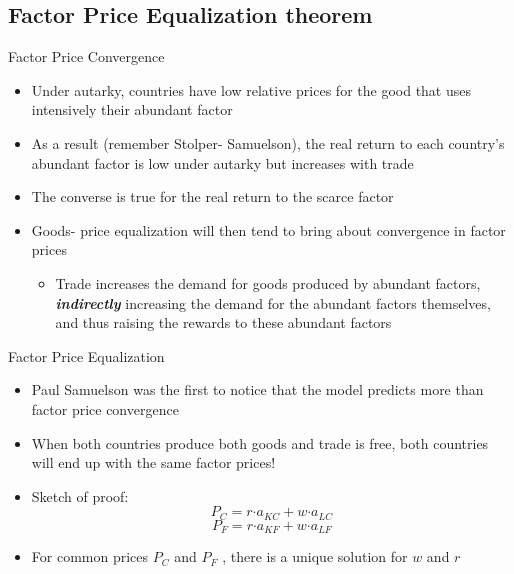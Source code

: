 \documentclass[10pt,hyperref={CJKbookmarks=true},xcolor=dvipsnames,aspectratio=169]{beamer}
\begin{document}
\subsection{Factor Price Equalization theorem}
\begin{frame}{Factor Price Convergence}

\begin{itemize}
\item Under autarky, countries have low relative prices for the good that
uses intensively their abundant factor 
\item As a result (remember Stolper- Samuelson), the real return to each
country’s abundant factor is low under autarky but increases with
trade 
\item The converse is true for the real return to the scarce factor 
\item Goods- price equalization will then tend to bring about convergence
in factor prices 

\begin{itemize}
\item Trade increases the demand for goods produced by abundant factors,
\textbf{\textit{indirectly}} increasing the demand for the abundant
factors themselves, and thus raising the rewards to these abundant
factors
\end{itemize}
\end{itemize}
\end{frame}

\begin{frame}{Factor Price Equalization }

\begin{itemize}
\item Paul Samuelson was the first to notice that the model predicts more
than factor price convergence 
\item When both countries produce both goods and trade is free, both countries
will end up with the same factor prices! 
\item Sketch of proof: 
\[
P_{C}=r\text{·}a_{KC}+w\text{·}a_{LC}
\]
\[
P_{F}=r\text{·}a_{KF}+w\text{·}a_{LF}
\]
 
\item For common prices $P_{C}$ and $P_{F}$ , there is a unique solution
for $w$ and $r$ 
\end{itemize}
\end{frame}
\end{document}
